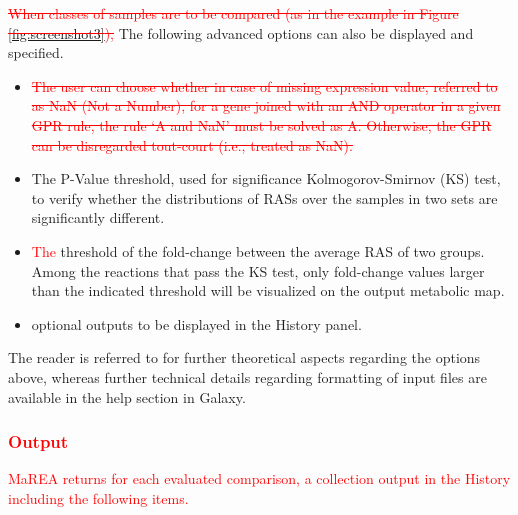 \documentclass[preprint,12pt,authoryear]{elsarticle}
\newcommand{\red}{\textcolor{red}}
\newcommand{\mareaTool}{\textsf{MaREA}}
\begin{document}
\red{\sout{When classes of samples are to be compared (as in the
    example in Figure \ref{fig:screenshot3}),}} The following advanced
options can also be displayed and specified.
\begin{itemize}
\item \red{\sout{ The user can choose whether in case of missing
      expression value, referred to as NaN (Not a Number), for a gene
      joined with an AND operator in a given GPR rule, the rule `A and
      NaN' must be solved as A. Otherwise, the GPR can be disregarded
      tout-court (i.e., treated as NaN).}}
  
\item The P-Value threshold, used for significance Kolmogorov-Smirnov
  (KS) test, to verify whether the distributions of RASs over the
  samples in two sets are significantly different.
  
\item \red{The} threshold of the fold-change between the average RAS of two
  groups. Among the reactions that pass the KS test,  only fold-change
  values larger than the indicated threshold will be visualized on the
  output metabolic map.
  
\item optional outputs to be displayed in the History panel.
\end{itemize}
%
The reader is referred to \citep{marea} for further theoretical
aspects regarding the options above, whereas further technical details
regarding formatting of input files are available in the help section
in Galaxy.


\red{\subsubsection{Output}}

\red{\mareaTool{} returns for each evaluated comparison, a collection
  output in the History including the following items.}
\end{document}
